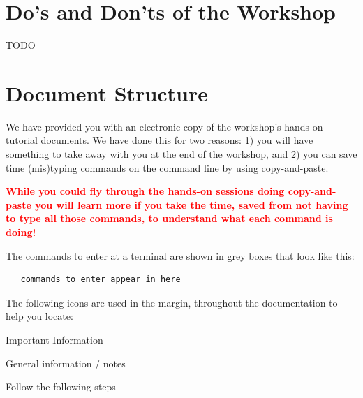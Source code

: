 %
%
\newpage

\section{Do's and Don'ts of the Workshop}

TODO

\section{Document Structure}
We have provided you with an electronic copy of the workshop's hands-on tutorial documents.
We have done this for two reasons: 1) you will have something to take away with you at the 
end of the workshop, and 2) you can save time (mis)typing commands on the command line by using
copy-and-paste.

\textcolor{red}{\bf While you could fly through the hands-on sessions doing
copy-and-paste you will learn more if you take the time, saved from not having to type all those
commands, to understand what each command is doing!}

The commands to enter at a terminal are shown in grey boxes that look like this:
\begin{lstlisting}
   commands to enter appear in here
\end{lstlisting}  

The following icons are used in the margin, throughout the documentation to help you locate:

\hspace*{.2cm} Important Information

\hspace*{.2cm} General information / notes

\hspace*{.2cm} Follow the following steps

